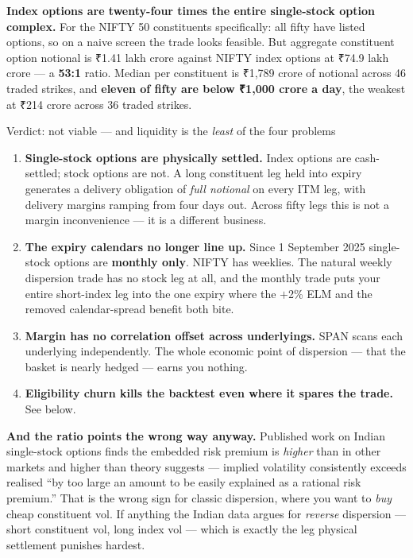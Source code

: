 \documentclass[11pt,a4paper]{article}
\newcommand{\rs}{₹}
\begin{document}
\textbf{Index options are twenty-four times the entire single-stock option
complex.} For the NIFTY 50 constituents specifically: all fifty have listed
options, so on a naive screen the trade looks feasible. But aggregate constituent
option notional is \rs 1.41 lakh crore against NIFTY index options at \rs 74.9
lakh crore --- a \textbf{53:1} ratio. Median per constituent is \rs 1{,}789 crore
of notional across 46 traded strikes, and \textbf{eleven of fifty are below
\rs 1{,}000 crore a day}, the weakest at \rs 214 crore across 36 traded strikes.

\begin{keyfact}{Verdict: not viable --- and liquidity is the \emph{least} of the four problems}
\begin{enumerate}
\item \textbf{Single-stock options are physically settled.} Index options are
cash-settled; stock options are not. A long constituent leg held into expiry
generates a delivery obligation of \emph{full notional} on every ITM leg, with
delivery margins ramping from four days out. Across fifty legs this is not a margin
inconvenience --- it is a different business.
\item \textbf{The expiry calendars no longer line up.} Since 1 September 2025
single-stock options are \textbf{monthly only}. NIFTY has weeklies. The natural
weekly dispersion trade has no stock leg at all, and the monthly trade puts your
entire short-index leg into the one expiry where the $+$2\% ELM and the removed
calendar-spread benefit both bite.
\item \textbf{Margin has no correlation offset across underlyings.} SPAN scans each
underlying independently. The whole economic point of dispersion --- that the
basket is nearly hedged --- earns you nothing.
\item \textbf{Eligibility churn kills the backtest even where it spares the trade.}
See below.
\end{enumerate}
\end{keyfact}

\textbf{And the ratio points the wrong way anyway.} Published work on Indian
single-stock options finds the embedded risk premium is \emph{higher} than in other
markets and higher than theory suggests --- implied volatility consistently exceeds
realised ``by too large an amount to be easily explained as a rational risk
premium.'' That is the wrong sign for classic dispersion, where you want to
\emph{buy} cheap constituent vol. If anything the Indian data argues for
\emph{reverse} dispersion --- short constituent vol, long index vol --- which is
exactly the leg physical settlement punishes hardest.
\end{document}
